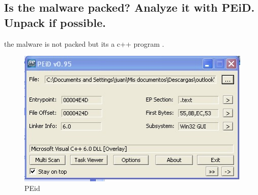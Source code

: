 \documentclass[12pt,letter]{article} %
\begin{document}
        \subsection{Is the malware packed? Analyze it with PEiD. Unpack if possible.}
            the malware is not packed but its a c++ program .\\
            \begin{figure}[h!]
                \centering
                \includegraphics[scale=0.5]{Peid.jpeg}
                \caption{PEid}
                \label{fig:Peid}
            \end{figure}$ $\\
\end{document}
